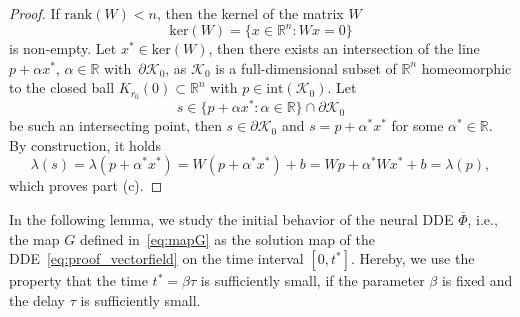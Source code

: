 \documentclass[10pt]{article}
\numberwithin{equation}{section}
\begin{document}
\begin{proof}
		If $\text{rank}(W) < n$, then the kernel of the matrix $W$
		\begin{equation*}
			\text{ker}(W) = \{x \in \mathbb{R}^n: Wx = 0\}
		\end{equation*}
		is non-empty. Let $x^\ast\in\text{ker}(W)$, then there exists an intersection of the line $p + \alpha x^\ast$, $\alpha \in \mathbb{R}$ with~$\partial \mathcal{K}_0$, as $\mathcal{K}_0$ is a full-dimensional subset of $\mathbb{R}^n$ homeomorphic to the closed ball $K_{r_0}(0)\subset \mathbb{R}^n$ with $p \in \text{int}(\mathcal{K}_0)$. Let
		\begin{equation*}
			s\in \{p + \alpha x^\ast: \alpha \in \mathbb{R}\} \cap \partial \mathcal{K}_0
		\end{equation*}
		be such an intersecting point, then $s \in\partial \mathcal{K}_0$ and $s = p + \alpha^\ast x^\ast$ for some $\alpha^\ast \in \mathbb{R}$. By construction, it holds
		\begin{equation*}
			\lambda(s) = \lambda(p + \alpha^\ast x^\ast) = W(p + \alpha^\ast x^\ast) + b = Wp + \alpha^\ast Wx^\ast +b = \lambda(p),
		\end{equation*}
		which proves part (c).
	\end{proof}
	
	In the following lemma, we study the initial behavior of the neural DDE $\overline{\Phi}$, i.e., the map $G$ defined in~\eqref{eq:mapG} as the solution map of the DDE~\eqref{eq:proof_vectorfield} on the time interval $[0,t^\ast]$. Hereby, we use the property that the time $t^\ast = \beta \tau$ is sufficiently small, if the parameter $\beta$ is fixed and the delay $\tau$ is sufficiently small.
	
\end{document}
